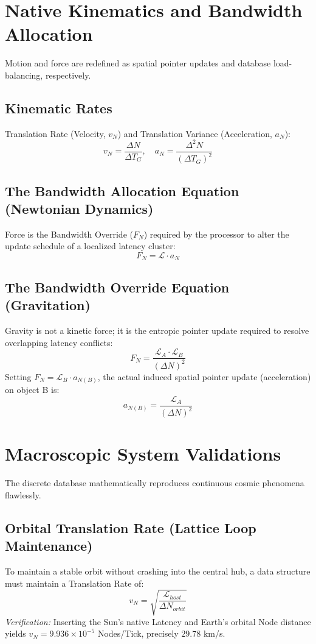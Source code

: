 \documentclass[12pt, a4paper]{article}
\begin{document}
\section{Native Kinematics and Bandwidth Allocation}
Motion and force are redefined as spatial pointer updates and database load-balancing, respectively.
\subsection{Kinematic Rates}
Translation Rate (Velocity, $v_N$) and Translation Variance (Acceleration, $a_N$):
\begin{equation}
    v_N = \frac{\Delta N}{\Delta T_G}, \quad a_N = \frac{\Delta^2 N}{(\Delta T_G)^2}
\end{equation}
\subsection{The Bandwidth Allocation Equation (Newtonian Dynamics)}
Force is the Bandwidth Override ($F_N$) required by the processor to alter the update schedule of a localized latency cluster:
\begin{equation}
    F_N = \mathcal{L} \cdot a_N
\end{equation}
\subsection{The Bandwidth Override Equation (Gravitation)}
Gravity is not a kinetic force; it is the entropic pointer update required to resolve overlapping latency conflicts:
\begin{equation}
    F_N = \frac{\mathcal{L}_A \cdot \mathcal{L}_B}{(\Delta N)^2}
\end{equation}
Setting $F_N = \mathcal{L}_B \cdot a_{N(B)}$, the actual induced spatial pointer update (acceleration) on object B is:
\begin{equation}
    a_{N(B)} = \frac{\mathcal{L}_A}{(\Delta N)^2}
\end{equation}
\section{Macroscopic System Validations}
The discrete database mathematically reproduces continuous cosmic phenomena flawlessly.
\subsection{Orbital Translation Rate (Lattice Loop Maintenance)}
To maintain a stable orbit without crashing into the central hub, a data structure must maintain a Translation Rate of:
\begin{equation}
    v_N = \sqrt{\frac{\mathcal{L}_{host}}{\Delta N_{orbit}}}
\end{equation}
\textit{Verification:} Inserting the Sun's native Latency and Earth's orbital Node distance yields $v_N = 9.936 \times 10^{-5}$ Nodes/Tick, precisely $29.78$ km/s.
\end{document}
